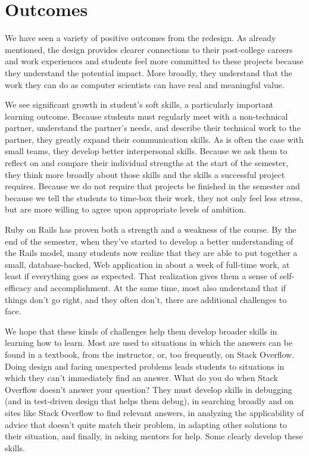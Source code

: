 \section{Outcomes}

We have seen a variety of positive outcomes from the redesign.  As
already mentioned, the design provides clearer connections to their
post-college careers and work experiences and students feel more
committed to these projects because they understand the potential
impact.  More broadly, they understand that the work they can do
as computer scientists can have real and meaningful value.

We see significant growth in student's soft skills, a particularly
important learning outcome.
Because students must regularly meet with a
non-technical partner, understand the partner's needs, and
describe their technical work to the partner,
they greatly expand their communication skills.
As is often the case with small teams, they develop better interpersonal
skills.  Because we ask them to reflect on and compare their individual
strengths at the start of the semester,
they think more broadly
about those skills and the skills a successful
project requires.  
Because we do
not require that projects be finished in the semester and because
we tell the students to time-box their work, they not only feel
less stress, but are more willing to agree upon appropriate levels
of ambition. 

Ruby on Rails has proven both a strength and a weakness
of the course.  By the end of the semester, when they've started to develop
a better understanding of the Rails model, many students now realize that they 
are able to put together a small, database-backed, Web application
in about a week of full-time work, at least if everything goes as
expected.  
That realization gives them a sense of self-efficacy
and accomplishment.  At the same time, most also understand that if things
don't go right, and they often don't, there are additional challenges
to face.

We hope that these kinds of challenges help them develop broader
skills in learning how to learn.  Most are used to situations in
which the answers can be found in a textbook, from the instructor,
or, too frequently, on Stack Overflow.  Doing design and facing 
unexpected problems leads students to situations in
which they can't immediately find an answer.  What do you do when
Stack Overflow doesn't answer your question?  They must develop skills
in debugging (and in test-driven design that helps them
debug), in searching broadly and on sites like Stack Overflow
to find relevant answers, in analyzing the applicability of advice
that doesn't quite match their problem, in adapting other
solutions to their situation, and finally, in asking mentors for help.
Some clearly develop these skills.  


